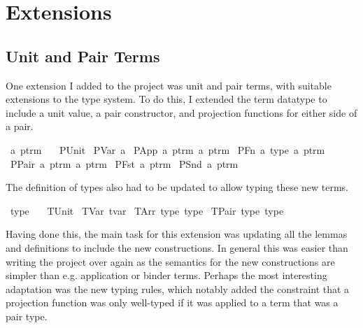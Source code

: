 \section{Extensions}
\subsection{Unit and Pair Terms}
One extension I added to the project was unit and pair terms, with suitable extensions to the type system.
To do this, I extended the term datatype to include a unit value, a pair constructor, and projection functions for either side of a pair.

\begin{implementation}
\isamarkupfalse%
\ {\isacharprime}a\ ptrm\ {\isacharequal}\isanewline
\ \ PUnit\isanewline
{\isacharbar}\ PVar\ {\isacharprime}a\isanewline
{\isacharbar}\ PApp\ {\isachardoublequoteopen}{\isacharprime}a\ ptrm{\isachardoublequoteclose}\ {\isachardoublequoteopen}{\isacharprime}a\ ptrm{\isachardoublequoteclose}\isanewline
{\isacharbar}\ PFn\ {\isacharprime}a\ type\ {\isachardoublequoteopen}{\isacharprime}a\ ptrm{\isachardoublequoteclose}\isanewline
{\isacharbar}\ PPair\ {\isachardoublequoteopen}{\isacharprime}a\ ptrm{\isachardoublequoteclose}\ {\isachardoublequoteopen}{\isacharprime}a\ ptrm{\isachardoublequoteclose}\isanewline
{\isacharbar}\ PFst\ {\isachardoublequoteopen}{\isacharprime}a\ ptrm{\isachardoublequoteclose}\isanewline
{\isacharbar}\ PSnd\ {\isachardoublequoteopen}{\isacharprime}a\ ptrm{\isachardoublequoteclose}\isanewline
\end{implementation}

The definition of types also had to be updated to allow typing these new terms.

\begin{implementation}
\isamarkupfalse%
\ type\ {\isacharequal}\isanewline
\ \ TUnit\isanewline
{\isacharbar}\ TVar\ tvar\isanewline
{\isacharbar}\ TArr\ type\ type\isanewline
{\isacharbar}\ TPair\ type\ type\isanewline
\end{implementation}

Having done this, the main task for this extension was updating all the lemmas and definitions to include the new constructions.
In general this was easier than writing the project over again as the semantics for the new constructions are simpler than e.g. application or binder terms.
Perhaps the most interesting adaptation was the new typing rules, which notably added the constraint that a projection function was only well-typed if it was applied to a term that was a pair type.

